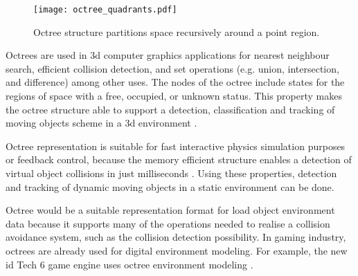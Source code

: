 \documentclass[12pt,a4paper,oneside,pdftex]{report}
\begin{document}
\begin{figure}[ht]
  \begin{center}
    \texttt{[image: octree\_quadrants.pdf]}
    \caption{Octree structure partitions space recursively around a point region.}
    \label{fig:octree_quadrants}
  \end{center}
\end{figure}

Octrees are used in 3d computer graphics applications for nearest neighbour search, efficient collision detection, and set operations (e.g. union, intersection, and difference) among other uses. The nodes of the octree include states for the regions of space with a free, occupied, or unknown status. This property makes the octree structure able to support a detection, classification and tracking of moving objects scheme in a 3d environment \citep{Azim12, Ouyang12}.

Octree representation is suitable for fast interactive physics simulation purposes or feedback control, because the memory efficient structure enables a detection of virtual object collisions in just milliseconds \citep{Noborio99}. Using these properties, detection and tracking of dynamic moving objects in a static environment can be done.

Octree would be a suitable representation format for load object environment data because it supports many of the operations needed to realise a collision avoidance system, such as the collision detection possibility. In gaming industry, octrees are already used for digital environment modeling. For example, the new id Tech 6 game engine uses octree environment modeling \citep{Shrout08}.




    
\end{document}
